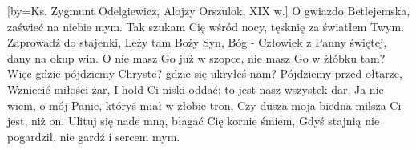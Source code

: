 [by={Ks. Zygmunt Odelgiewicz, Alojzy Orszulok, XIX w.}]
\beginverse
O gwiazdo Betlejemska,
zaświeć na niebie mym.
Tak szukam Cię wśród nocy,
tęsknię za światłem Twym.
\endverse
\beginchorus
Zaprowadź do stajenki,
Leży tam Boży Syn,
Bóg - Człowiek z Panny świętej,
dany na okup win.
\endchorus
\beginverse
O nie masz Go już w szopce,
nie masz Go w żłóbku tam?
Więc gdzie pójdziemy Chryste?
gdzie się ukryłeś nam?
\endverse
\beginchorus
Pójdziemy przed ołtarze,
Wzniecić miłości żar,
I hołd Ci niski oddać:
to jest nasz wszystek dar.
\endchorus
\beginverse
Ja nie wiem, o mój Panie,
któryś miał w żłobie tron,
Czy dusza moja biedna
milsza Ci jest, niż on.
\endverse
\beginchorus
Ulituj się nade mną, błagać Cię
kornie śmiem,
Gdyś stajnią nie pogardził,
nie gardź i sercem mym.
\endchorus
\endsong


